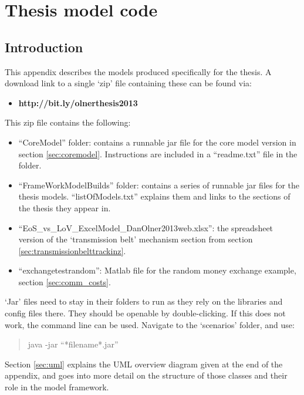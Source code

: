 \chapter{Thesis model code \label{apx:modelcodeoverview}}

\section{Introduction}

This appendix describes the models produced specifically for the thesis. A download link to a single `zip' file containing these can be found via:

\begin{itemize}
\item \textbf{http://bit.ly/olnerthesis2013}
\end{itemize}

This zip file contains the following:

\begin{itemize}
	\item ``CoreModel'' folder: contains a runnable jar file for the core model version in section \ref{sec:coremodel}. Instructions are included in a ``readme.txt'' file in the folder.
\item ``FrameWorkModelBuilds'' folder: contains a series of runnable jar files for the thesis models. ``listOfModels.txt'' explains them and links to the sections of the thesis they appear in. 
\item ``EoS\_vs\_LoV\_ExcelModel\_DanOlner2013web.xlsx'': the spreadsheet version of the `transmission belt' mechanism section from section \ref{sec:transmissionbelttrackinz}.
\item ``exchangetestrandom'': Matlab file for the random money exchange example, section \ref{sec:comm_costs}.
\end{itemize}

`Jar' files need to stay in their folders to run as they rely on the libraries and config files there. They should be openable by double-clicking. If this does not work, the command line can be used. Navigate to the `scenarios' folder, and use:

\begin{quote}
java -jar ``*filename*.jar''
\end{quote}

Section \ref{sec:uml} explains the UML overview diagram given at the end of the appendix, and goes into more detail on the structure of those classes and their role in the model framework.

